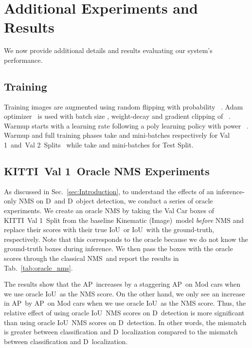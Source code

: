 \documentclass[final]{cvpr}
\newcommand{\myReferTable}[1]{Tab.~\ref{#1}}
\newcommand{\myReferSection}[1]{Sec.~\ref{#1}}
\newcommand{\kinematicImage}{Kinematic (Image)}
\newcommand{\iou}{IoU}
\newcommand{\twoD}{D}
\newcommand{\threeD}{D}
\newcommand{\iouTwoD}{\iou}
\newcommand{\iouThreeD}{\iou}
\newcommand{\ap}{AP}
\newcommand{\apthreeD}{\ap}
\newcommand{\apTwoD}{\ap}
\newcommand{\classicalNms}{classical NMS}
\newcommand{\kitti}{KITTI}
\newcommand{\valOne}{Val 1}
\newcommand{\valTwo}{Val 2}
\begin{document}
\section{Additional Experiments and Results}\label{sec:additional_exp}
    We now provide additional details and results evaluating our system's performance.

\subsection{Training}\label{sec:training_additional}
        Training images are augmented using random flipping with probability ~\cite{brazil2020kinematic}.
        Adam optimizer~\cite{kingma2014adam} is used with batch size , weight-decay  and gradient clipping of ~\cite{brazil2019m3d, brazil2020kinematic}.
        Warmup starts with a learning rate  following a poly learning policy with power ~\cite{brazil2020kinematic}.
        Warmup and full training phases take  and  mini-batches respectively for \valOne~and~\valTwo~Splits~\cite{brazil2020kinematic} while take  and  mini-batches for Test Split. 

\subsection{\kitti~\valOne~Oracle NMS Experiments}\label{sec:results_oracle_additional}
        As discussed in \myReferSection{sec:Introduction}, to understand the effects of an inference-only NMS on \twoD~and \threeD~object detection, we conduct a series of oracle experiments.
        We create an oracle NMS by taking the Val Car boxes of \kitti~\valOne~Split from the baseline \kinematicImage~model \textit{before} NMS and replace their scores with their true \iouTwoD~or \iouThreeD~with the ground-truth, respectively. 
        Note that this corresponds to the oracle because we do not know the ground-truth boxes during inference.
        We then pass the boxes with the oracle scores through the \classicalNms~and report the results in \myReferTable{tab:oracle_nms}.
        
        The results show that the \apthreeD~increases by a staggering  \ap~on Mod cars when we use oracle \iouThreeD~as the NMS score.
        On the other hand, we only see an increase in \apTwoD~by  \ap~on Mod cars when we use oracle \iouTwoD~as the NMS score.
        Thus, the relative effect of using oracle \iouThreeD~NMS scores on \threeD~detection is more significant than using oracle \iouTwoD~NMS scores on \twoD~detection.
        In other words, the mismatch is greater between classification and \threeD~localization compared to the mismatch between classification and \twoD~localization.
\end{document}
